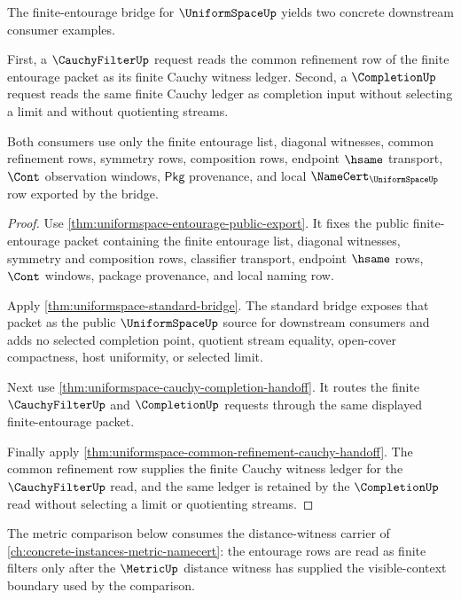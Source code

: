 \begin{theorem}
\label{thm:uniformspace-finite-cauchy-completion-consumer-examples}
The finite-entourage bridge for $\UniformSpaceUp$ yields two concrete
downstream consumer examples.

First, a $\CauchyFilterUp$ request reads the common refinement row of the
finite entourage packet as its finite Cauchy witness ledger. Second, a
$\CompletionUp$ request reads the same finite Cauchy ledger as completion input
without selecting a limit and without quotienting streams.

Both consumers use only the finite entourage list, diagonal witnesses, common
refinement rows, symmetry rows, composition rows, endpoint $\hsame$ transport,
$\Cont$ observation windows, $\mathsf{Pkg}$ provenance, and local
$\NameCert_{\UniformSpaceUp}$ row exported by the bridge.
\end{theorem}
\begin{proof}
Use \autoref{thm:uniformspace-entourage-public-export}. It fixes the public
finite-entourage packet containing the finite entourage list, diagonal
witnesses, symmetry and composition rows, classifier transport, endpoint
$\hsame$ rows, $\Cont$ windows, package provenance, and local naming row.

Apply \autoref{thm:uniformspace-standard-bridge}. The standard bridge exposes
that packet as the public $\UniformSpaceUp$ source for downstream consumers and
adds no selected completion point, quotient stream equality, open-cover
compactness, host uniformity, or selected limit.

Next use \autoref{thm:uniformspace-cauchy-completion-handoff}. It routes the
finite $\CauchyFilterUp$ and $\CompletionUp$ requests through the same displayed
finite-entourage packet.

Finally apply \autoref{thm:uniformspace-common-refinement-cauchy-handoff}. The
common refinement row supplies the finite Cauchy witness ledger for the
$\CauchyFilterUp$ read, and the same ledger is retained by the $\CompletionUp$
read without selecting a limit or quotienting streams.
\end{proof}

The metric comparison below consumes the distance-witness carrier of
\autoref{ch:concrete-instances-metric-namecert}: the entourage rows are read as
finite filters only after the $\MetricUp$ distance witness has supplied the
visible-context boundary used by the comparison.

